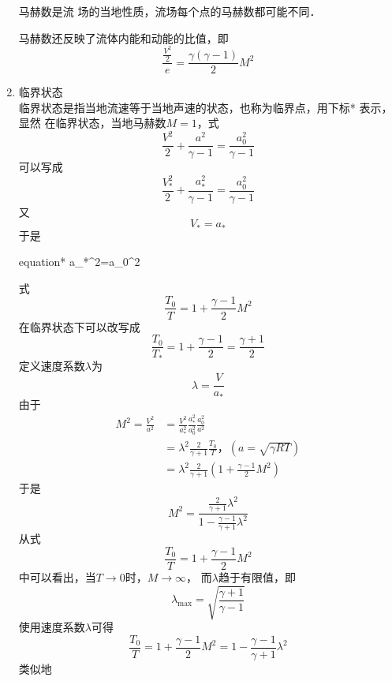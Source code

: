 \begin{enumerate}
\begin{notice}
        马赫数是流
        场的当地性质，流场每个点的马赫数都可能不同．

        马赫数还反映了流体内能和动能的比值，即
        \[
          \frac{\frac{V^2}{2}}{e}=\frac{\gamma(\gamma-1)}{2}M^2
        \]
        \end{notice}
        
	\item 临界状态 \\
	      临界状态是指当地流速等于当地声速的状态，也称为临界点，用下标* 表示，显然
	      在临界状态，当地马赫数$M=1 $，式
	      \[
		      \frac{V^2}{2 }+\frac{a^2}{\gamma-1}=\frac{a_0^2}{\gamma-1}
	      \]
	      可以写成
	      \[
		      \frac{V_*^2}{2 }+\frac{a_*^2}{\gamma-1 }=\frac{a_0^2}{\gamma-1 }
	      \]
	      又
	      \[
		      V_*=a_*
	      \]
	      于是
	      \begin{empheq}[box=\bluebox]{equation*}
		      a_*^2=a_0^2
	      \end{empheq}
	      式
	      \[
		      \frac{T_0}{T }=1+\frac{\gamma-1 }{2 }M^2
	      \]
	      在临界状态下可以改写成
	      \[
		      \frac{T_0}{T_* }=1+\frac{\gamma-1 }{2 }=\frac{\gamma+1 }{2 }
	      \]
	      定义速度系数$\lambda$为
	      \[
		      \lambda =\frac{V}{a_* }
	      \]
	      由于
	      \begin{equation}
		      \begin{split}
			      M^2=\frac{V^2}{a^2} & =\frac{V^2}{a_*^2}
			      \frac{a_*^2}{a_0^2} \frac{a_0^2}{a^2}                                           \\
			                          & =\lambda^2 \frac{2}{\gamma+1} \frac{T_0}{T }
			      ，(a=\sqrt{\gamma RT } )                                                         \\
			                          & =\lambda^2 \frac{2}{\gamma+1 }(1+\frac{\gamma-1 }{2 }M^2)
		      \end{split}
		      \label{eq:12}
	      \end{equation}
	      于是
	      \[
		      M^2=\frac{\frac{2}{\gamma+1 }\lambda^2}{1-\frac{\gamma-1 }{\gamma+1 }\lambda^2}
	      \]
	      从式
	      \[
		      \frac{T_0}{T }=1+\frac{\gamma-1 }{2 }M^2
	      \]
	      中可以看出，当$T\rightarrow 0 $时，$M\rightarrow \infty$，
	      而$\lambda$趋于有限值，即
	      \[
		      \lambda_{\max}=\sqrt{\frac{\gamma+1 }{\gamma-1 }}
	      \]
	      使用速度系数$\lambda$可得
	      \[
		      \frac{T_0}{T }=1+\frac{\gamma-1 }{2 }M^2=1-\frac{\gamma-1 }{\gamma+1 }\lambda^2
	      \]
	      类似地
	      \begin{equation}

\end{equation}
\end{enumerate}
